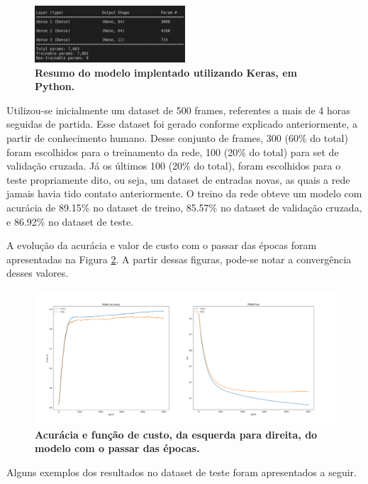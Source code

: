 \documentclass[10pt,fleqn,a4paper]{article}
\begin{document}
\begin{figure}[H]
\centering
\includegraphics[width=0.5\textwidth]{figures/model-summary.jpeg}
\caption{\textbf{Resumo do modelo implentado utilizando Keras, em Python.}} \label{fig:model-summary}
\end{figure}

	Utilizou-se inicialmente um dataset de 500 frames, referentes a mais de 4 horas seguidas de partida. Esse dataset foi gerado conforme explicado anteriormente, a partir de conhecimento humano. Desse conjunto de frames, 300 (60\% do total) foram escolhidos para o treinamento da rede, 100 (20\% do total) para set de validação cruzada. Já os últimos 100 (20\% do total), foram escolhidos para o teste propriamente dito, ou seja, um dataset de entradas novas, as quais a rede jamais havia tido contato anteriormente. O treino da rede obteve um modelo com acurácia de 89.15\% no dataset de treino, 85.57\% no dataset de validação cruzada, e 86.92\% no dataset de teste.
	
	A evolução da acurácia e valor de custo com o passar das épocas foram apresentadas na Figura \ref{fig:acc-loss}. A partir dessas figuras, pode-se notar a convergência desses valores.
	
\begin{figure}[H]
	\centering
	\includegraphics[width=1.0\textwidth]{figures/model-accuracy-loss.png}
   \caption{\textbf{Acurácia e função de custo, da esquerda para direita, do modelo com o passar das épocas.}} \label{fig:acc-loss}
\end{figure}
	
	Alguns exemplos dos resultados no dataset de teste foram apresentados a seguir.
\end{document}
